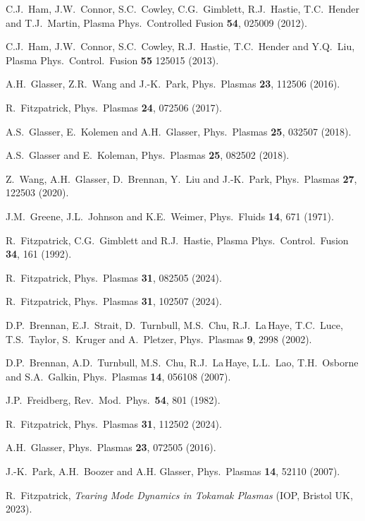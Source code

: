 \documentclass[12pt,prb,aps]{revtex4-1}
\begin{document}
\begin{thebibliography}{99}
 C.J.~Ham, J.W.~Connor, S.C.~Cowley, C.G.~Gimblett, R.J.~Hastie, T.C.~Hender and T.J.~Martin, Plasma Phys.\ Controlled Fusion {\bf 54}, 025009 (2012). 

 C.J.~Ham, J.W.~Connor, S.C.~Cowley, R.J.~Hastie, T.C.~Hender and Y.Q.~Liu, Plasma Phys.\ Control.\ Fusion {\bf 55} 125015 (2013).

 A.H.~Glasser, Z.R.~Wang and J.-K.~Park, Phys.\ Plasmas {\bf 23}, 112506 (2016).

 R.~Fitzpatrick, Phys.\ Plasmas {\bf 24}, 072506 (2017). 

 A.S.~Glasser, E.~Kolemen and A.H.~Glasser, Phys.\ Plasmas {\bf 25}, 032507 (2018).

 A.S.~Glasser and E.~Koleman, Phys.\ Plasmas {\bf 25}, 082502 (2018). 

 Z.~Wang, A.H.~Glasser, D.~Brennan, Y.~Liu and J.-K.~Park, Phys.\ Plasmas {\bf 27}, 122503 (2020).

 J.M.~Greene, J.L.~Johnson and K.E.~Weimer,  Phys.\  Fluids  {\bf 14}, 671 (1971).

 R.~Fitzpatrick, C.G.~Gimblett and R.J.~Hastie, Plasma Phys.\ Control.\ Fusion {\bf 34}, 161 (1992). 

 R.~Fitzpatrick, Phys.\ Plasmas {\bf 31}, 082505 (2024).

 R.~Fitzpatrick, Phys.\ Plasmas {\bf 31}, 102507 (2024).

 D.P.~Brennan, E.J.~Strait, D.~Turnbull, M.S.~Chu, R.J.~La\,Haye, T.C.~Luce, T.S.~Taylor, S.~Kruger and A.~Pletzer, Phys.\ Plasmas {\bf 9}, 2998 (2002).

 D.P.~Brennan, A.D.~Turnbull, M.S.~Chu, R.J.~La\,Haye, L.L.~Lao, T.H.~Osborne and S.A.~Galkin, Phys.\ Plasmas {\bf 14}, 056108 (2007). 

 J.P.~Freidberg, Rev.\ Mod.\ Phys.\ {\bf 54},  801 (1982).

 R.~Fitzpatrick, Phys.\ Plasmas {\bf 31}, 112502 (2024).

 A.H.~Glasser, Phys.\ Plasmas {\bf 23}, 072505 (2016).

 J.-K.~Park, A.H.~Boozer and A.H. Glasser, Phys.\  Plasmas {\bf 14}, 52110 (2007).

 R.~Fitzpatrick, {\em Tearing Mode Dynamics in Tokamak Plasmas} (IOP, Bristol UK, 2023). 


\end{thebibliography}
\end{document}
